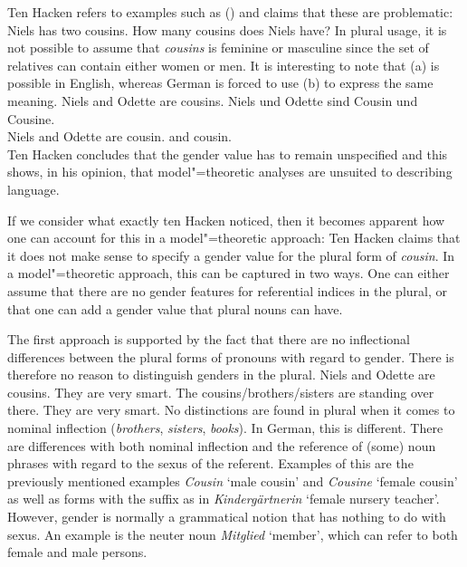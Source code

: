 \noindent
Ten Hacken refers to examples such as () and claims that these are problematic:
\eal
\ex Niels has two cousins.
\ex How many cousins does Niels have?
\zl
In plural usage, it is not possible to assume that \emph{cousins} is feminine or masculine since the set of relatives can contain
either women or men. It is interesting to note that (a) is possible in English, whereas German is forced to use (b)
to express the same meaning.
\eal
\ex Niels and Odette are cousins.
\ex 
\gll Niels und Odette sind Cousin und Cousine.\\
	 Niels and Odette are cousin.\mas{} and cousin.\fem\\
\zl
Ten Hacken concludes that the gender value has to remain unspecified and this shows, in his opinion, that model"=theoretic analyses
are unsuited to describing language.

If we consider what exactly ten Hacken noticed, then it becomes apparent how one can account for this in a model"=theoretic approach:
Ten Hacken claims that it does not make sense to specify a gender value for the plural form of \emph{cousin}. In a model"=theoretic approach, this can be captured
 in two ways. One can either assume that there are no gender features for referential indices in the
plural, or that one can add a gender value that plural nouns can have.

The first approach is supported by the fact that there are no inflectional differences between the
plural forms of pronouns with regard to gender. There is therefore no reason to distinguish genders
in the plural.
\eal
\ex Niels and Odette are cousins. They are very smart.
\ex The cousins/brothers/sisters are standing over there. They are very smart.
\zl
No distinctions are found in plural when it comes to nominal inflection (\emph{brothers},
\emph{sisters}, \emph{books}). In German, this is different. There are differences with both nominal
inflection and the reference of (some) noun phrases 
with regard to the sexus of the referent.
Examples of this are the previously mentioned examples \emph{Cousin} `male cousin' and
\emph{Cousine} `female cousin' as well as forms with the suffix  as in \emph{Kindergärtnerin} `female nursery teacher'.
However, gender is normally a grammatical notion that has nothing to do with sexus.
An example is the neuter noun \emph{Mitglied} `member', which can refer to both female and male persons.

